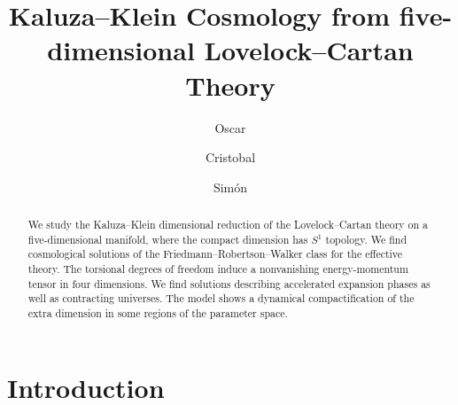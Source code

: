 \documentclass[aps,prd,12pt,superscriptaddress,showpacs,showkeys,longbibliography,reprint,nofootinbib]{revtex4-1}
\begin{document}
\title{Kaluza--Klein Cosmology from five-dimensional Lovelock--Cartan Theory}

\author{Oscar }

\author{Cristobal }

\author{Sim\'on }


\begin{abstract}
  We study the Kaluza--Klein dimensional reduction of the Lovelock--Cartan theory on a five-dimensional manifold, where the compact dimension has $S^1$ topology. We find cosmological solutions of the Friedmann--Robertson--Walker class for the effective theory.
  The torsional degrees of freedom induce a nonvanishing energy-momentum tensor in four dimensions. We find solutions describing accelerated expansion phases as well as contracting universes. The model shows a dynamical compactification of the extra dimension in some regions of the parameter space. 
\end{abstract}



\maketitle

\section{Introduction}
\end{document}
